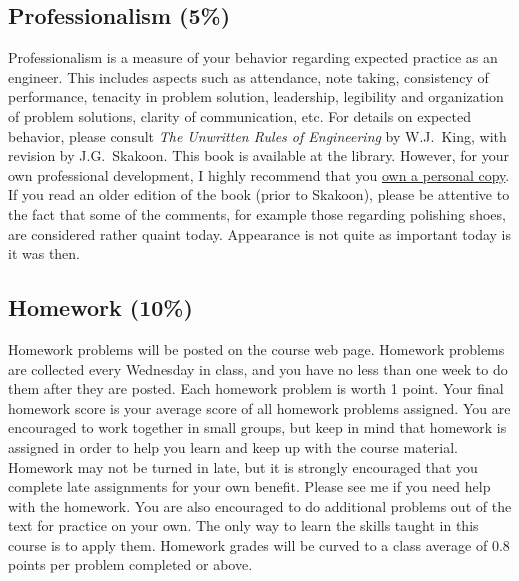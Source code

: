 \documentclass[10pt]{article}
\begin{document}
\subsection{Professionalism (5\%)}
Professionalism is a measure of your behavior regarding expected practice as an engineer. This includes aspects such as attendance, note taking, consistency of performance, tenacity in problem solution, leadership, legibility and organization of problem solutions, clarity of communication, etc. For details on expected behavior, please consult \emph{The Unwritten Rules of Engineering} by W.J.~King, with revision by  J.G.~Skakoon. This book is available at the library. However, for your own professional development, I highly recommend that you \href{http://members.asme.org/catalog/ItemView.cfm?ItemNumber=801624}{own a personal copy}. If you read an older edition of the book (prior to Skakoon), please be attentive to the fact that some of the comments, for example those regarding polishing shoes, are considered rather quaint today. Appearance is not quite as important today is it was then.  

\subsection{Homework (10\%)}
Homework problems will be posted on the course web page. Homework problems are collected every Wednesday in class, and you have no less than one week to do them after they are posted.   
Each homework problem is worth 1 point.  Your final homework score is your average score of all homework problems assigned.  You are encouraged to work together in small groups, but keep in mind that homework is assigned in order to help you learn and keep up with the course material. 
Homework may not be turned in late, but it is strongly encouraged that you complete late assignments for your own benefit. Please see me if you need help with the homework. You are also encouraged to do additional problems out of the text for practice on your own. The only way to learn the skills taught in this course is to apply them. Homework grades will be curved to a class average of 0.8 points per problem completed or above.
\end{document}
